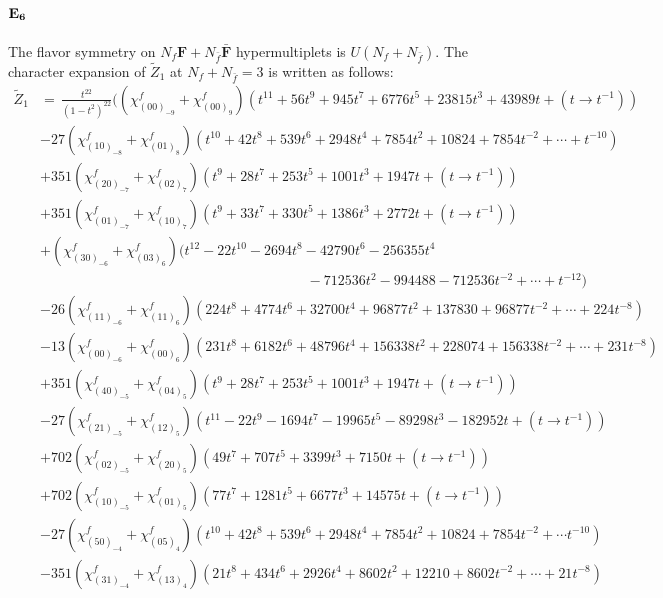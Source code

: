 \documentclass[letterpaper, 11pt]{article}
\newcommand{\nn}{\nonumber}
\begin{document}
{\paragraph{$\bf E_6$}
The flavor symmetry on $N_f\mathbf{F} + N_{\bar{f}}\bar{\mathbf{F}}$ hypermultiplets is $U(N_f + N_{\bar{f}})$. The character expansion of $\tilde{Z}_1$ at $N_f+ N_{\bar{f}} = 3$ is written as follows:
  \begin{align}
    \label{eq:E6F3}
    \tilde{Z}_1&=\,\frac{t^{22}}{(1-t^2)^{22}}\Big((\chi^f_{(00)_{-9}}+\chi^f_{(00)_9})(t^{11}+56 t^9+945 t^7+6776 t^5+23815 t^3+43989 t+(t\rightarrow t^{-1}))\nn\\
&-27(\chi^f_{(10)_{-8}}+\chi^f_{(01)_8})(t^{10}+42 t^8+539 t^6+2948 t^4+7854 t^2+10824+7854t^{-2}+\cdots+t^{-10})\nn\\
&+351(\chi^f_{(20)_{-7}}+\chi^f_{(02)_7}) (t^9+28 t^7+253 t^5+1001 t^3+1947t+(t\rightarrow t^{-1}))\nn\\
&+351(\chi^f_{(01)_{-7}}+\chi^f_{(10)_7}) (t^9+33 t^7+330 t^5+1386 t^3+2772t+(t\rightarrow t^{-1}))\\
&+(\chi^f_{(30)_{-6}}+\chi^f_{(03)_6})(t^{12}-22 t^{10}-2694 t^8-42790 t^6-256355 t^4\nn\\
&\hspace{8cm}-712536 t^2-994488-712536t^{-2}+\cdots+t^{-12})\nn\\
&-26(\chi^f_{(11)_{-6}}+\chi^f_{(11)_6})(224 t^8+4774 t^6+32700 t^4+96877 t^2+137830+96877t^{-2}+\cdots +224t^{-8})\nn\\
&-13(\chi^f_{(00)_{-6}}+\chi^f_{(00)_6})(231 t^8+6182 t^6+48796 t^4+156338 t^2+228074+156338 t^{-2}+\cdots+231t^{-8})\nn\\
&+351(\chi^f_{(40)_{-5}}+\chi^f_{(04)_5})(t^9+28 t^7+253 t^5+1001 t^3+1947t+(t\rightarrow t^{-1}))\nn\\
&-27(\chi^f_{(21)_{-5}}+\chi^f_{(12)_5})(t^{11}-22 t^9-1694 t^7-19965 t^5-89298 t^3-182952t+(t\rightarrow t^{-1}))\nn\\
&+702(\chi^f_{(02)_{-5}}+\chi^f_{(20)_5})(49 t^7+707 t^5+3399 t^3+7150t+(t\rightarrow t^{-1}))\nn\\
&+702(\chi^f_{(10)_{-5}}+\chi^f_{(01)_5})(77 t^7+1281 t^5+6677 t^3+14575t+(t\rightarrow t^{-1}))\nn\\
&-27(\chi^f_{(50)_{-4}}+\chi^f_{(05)_4})(t^{10}+42 t^8+539 t^6+2948 t^4+7854 t^2+10824+7854t^{-2}+\cdots t^{-10})\nn\\
&-351(\chi^f_{(31)_{-4}}+\chi^f_{(13)_4})(21 t^8+434 t^6+2926 t^4+8602 t^2+12210+8602t^{-2}+\cdots+21t^{-8})\nn\\

\end{align}}
\end{document}
